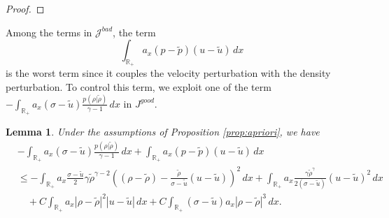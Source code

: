 \documentclass[11pt,reqno]{amsart}
\newtheorem{lemma}{Lemma}[section]
\numberwithin{equation}{section} %
\newcommand{\R}{\mathbb{R}}
\begin{document}
\begin{proof}
\end{proof}

Among the terms in $\mathcal{J}^{bad}$, the term
\[
    \int_{\mathbb{R}_+} a_x (p-\tilde{p})(u-\tilde{u}) \,dx
\]
is the worst term since it couples the velocity perturbation with the density perturbation. To control this term, we exploit one of the term $-\int_{\mathbb{R}_+} a_x (\sigma-\tilde{u}) \frac{p(\rho|\tilde{\rho})}{\gamma-1} \,dx$ in $J^{good}$. 

\begin{lemma}%
    Under the assumptions of Proposition \ref{prop:apriori}, we have
	\begin{align*}
		&-\int_{\R_+}a_x(\sigma-\tilde{u})\frac{p(\rho|\tilde{\rho})}{\gamma-1}\,dx +\int_{\R_+}a_x(p-\tilde{p})(u-\tilde{u})\,dx\\
		&\le -\int_{\R_+}a_x\frac{\sigma-\tilde{u}}{2}\gamma\tilde{\rho}^{\gamma-2}\left((\rho-\tilde{\rho})-\frac{\tilde{\rho}}{\sigma-\tilde{u}}(u-\tilde{u})\right)^2\,dx+\int_{\R_+}a_x\frac{\gamma\tilde{\rho}^{\gamma}}{2(\sigma-\tilde{u})}(u-\tilde{u})^2\,dx\\
		&\quad +C\int_{\R_+}a_x|\rho-\tilde{\rho}|^2|u-\tilde{u}|\,dx +C\int_{\R_+} (\sigma-\tilde{u})a_x|\rho-\tilde{\rho}|^3 \, dx.
	\end{align*}
\end{lemma}
\end{document}
